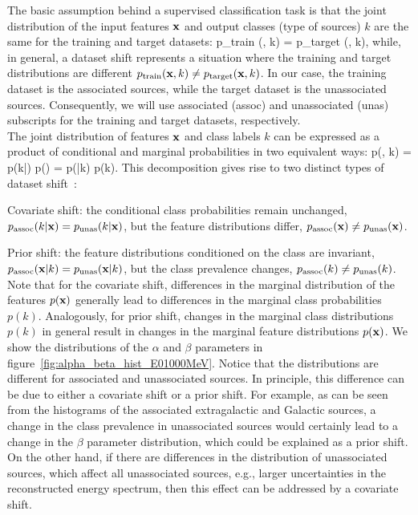 The basic assumption behind a supervised classification task is that the joint distribution of the input features $\textbf{x}$
and output classes (type of sources) $k$  are the same for the training and target datasets:
\be
p_{\rm train} (\bx, k) = p_{\rm target} (\bx, k),
\ee
while, in general, a dataset shift represents a situation where the training and target distributions are different
$p_{\rm train} (\textbf{x}, k) \neq p_{\rm target} (\textbf{x}, k)$.
In our case, the training dataset is the associated sources, while the target dataset is the unassociated sources.
Consequently, we will use associated (assoc) and unassociated (unas) subscripts for the training and target datasets, respectively.
\\
The joint distribution of features $\textbf{x}$ and class labels $k$ can be expressed as a product of conditional and marginal probabilities in two equivalent ways:
\be
p(\bx, k) = p(k|\bx) p(\bx) = p(\bx|k) p(k).
\ee
This decomposition gives rise to two distinct types of dataset shift~\citep{MorenoTorres2012AUV}:
\ben
\item
{ Covariate shift}: the conditional class probabilities remain unchanged,\\
{$p_{\rm assoc}(k|\textbf{x}) = p_{\rm unas}(k|\textbf{x})$}, but the feature distributions differ, $p_{\rm assoc}(\textbf{x}) \neq p_{\rm unas}(\textbf{x})$.
\item
{ Prior shift}: the feature distributions conditioned on the class are invariant, $p_{\rm assoc}(\textbf{x}|k) = p_{\rm unas}(\textbf{x}|k)$, but the class prevalence changes, $p_{\rm assoc}(k) \neq p_{\rm unas}(k)$.
\een
Note that for the covariate shift, differences in the marginal distribution of the features $p(\textbf{x})$ generally lead to differences in the marginal class probabilities $p(k)$.
Analogously, for prior shift, changes in the marginal class distributions $p(k)$ in general result in changes in the marginal feature distributions $p(\textbf{x})$. We show the distributions of the $\alpha$ and $\beta$ parameters in figure~\ref{fig:alpha_beta_hist_E01000MeV}. Notice that the distributions are different for associated and unassociated sources.
In principle, this difference can be due to either a covariate shift or a prior shift. 
For example, as can be seen from the histograms of the associated extragalactic and Galactic sources, a change in the class prevalence in unassociated sources would certainly lead to a change in the $\beta$ parameter distribution, which could be explained as a prior shift.
On the other hand, if there are differences in the distribution of unassociated sources, which affect all unassociated sources, e.g., larger uncertainties in the reconstructed energy spectrum, 
then this effect can be addressed by a covariate shift.

